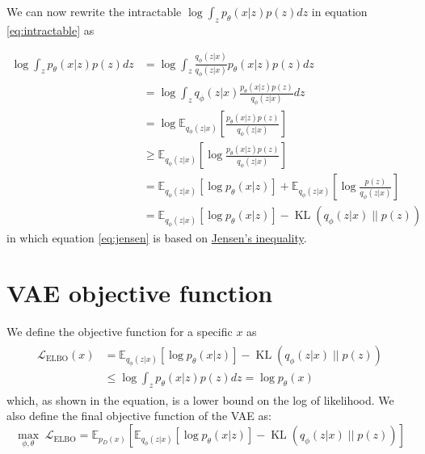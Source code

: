 \documentclass{article}
\newcommand{\kl}[2]{\operatorname{KL}({#1} \; || \; {#2})}
\begin{document}
We can now rewrite the intractable $\log \int_z p_\theta(x|z) p(z) dz$ in equation \ref{eq:intractable} as

\begin{align}
    \log \int_z p_\theta(x|z) p(z) dz &=
    \log \int_z \frac{q_\phi(z|x)}{q_\phi(z|x)} p_\theta(x|z) p(z) dz \\
    &= \log \int_z q_\phi(z|x) \frac{p_\theta(x|z) p(z)}{q_\phi(z|x)} dz \\
    &= \log \mathbb{E}_{q_\phi(z|x)}[\frac{p_\theta(x|z) p(z)}{q_\phi(z|x)}] \\
    &\ge \mathbb{E}_{q_\phi(z|x)}[\log \frac{p_\theta(x|z) p(z)}{q_\phi(z|x)}] \label{eq:jensen}\\
    &= \mathbb{E}_{q_\phi(z|x)}[\log p_\theta(x|z)] + \mathbb{E}_{q_\phi(z|x)}[\log \frac{p(z)}{q_\phi(z|x)}] \\
    &= \mathbb{E}_{q_\phi(z|x)}[\log p_\theta(x|z)] - \kl{q_\phi(z|x)}{p(z)}
\end{align}
in which equation \ref{eq:jensen} is based on \href{https://en.wikipedia.org/wiki/Jensen\%27s_inequality}{Jensen's inequality}.

\section{VAE objective function}
We define the objective function for a specific $x$ as
\begin{align}
    \begin{split}
        \mathcal{L}_{\text{ELBO}}(x) &= \mathbb{E}_{q_\phi(z|x)}[\log p_\theta(x|z)] - \kl{q_\phi(z|x)}{p(z)} \\
    &\le \log \int_z p_\theta(x|z) p(z) dz = \log p_\theta(x)
    \end{split}
\end{align}
which, as shown in the equation, is a lower bound on the log of likelihood.
We also define the final objective function of the VAE as:
\begin{equation}
    \label{eq:elbo}
    \underset{\phi, \theta}{\max} \; \mathcal{L}_{\text{ELBO}} = \mathbb{E}_{p_D(x)} \left[ \mathbb{E}_{q_\phi(z|x)}[\log p_\theta(x|z)] - \kl{q_\phi(z|x)}{p(z)} \right]
\end{equation}
\end{document}
